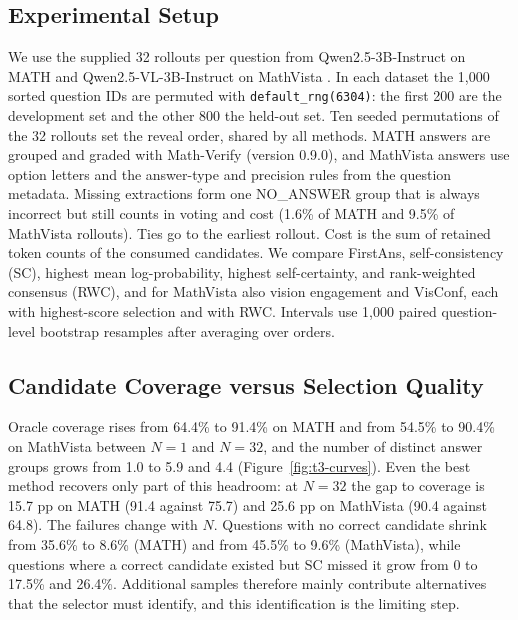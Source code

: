 \documentclass{article}
\begin{document}
\subsection{Experimental Setup}
We use the supplied 32 rollouts per question from Qwen2.5-3B-Instruct \citep{qwen25} on MATH \citep{hendrycks2021math} and Qwen2.5-VL-3B-Instruct \citep{qwen25vl} on MathVista \citep{lu2024mathvista}. In each dataset the 1,000 sorted question IDs are permuted with \texttt{default\_rng(6304)}: the first 200 are the development set and the other 800 the held-out set. Ten seeded permutations of the 32 rollouts set the reveal order, shared by all methods. MATH answers are grouped and graded with Math-Verify \citep{mathverify} (version 0.9.0), and MathVista answers use option letters and the answer-type and precision rules from the question metadata. Missing extractions form one NO\_ANSWER group that is always incorrect but still counts in voting and cost (1.6\% of MATH and 9.5\% of MathVista rollouts). Ties go to the earliest rollout. Cost is the sum of retained token counts of the consumed candidates. We compare FirstAns, self-consistency (SC), highest mean log-probability, highest self-certainty, and rank-weighted consensus (RWC), and for MathVista also vision engagement and VisConf, each with highest-score selection and with RWC. Intervals use 1,000 paired question-level bootstrap resamples after averaging over orders.

\subsection{Candidate Coverage versus Selection Quality}
Oracle coverage rises from 64.4\% to 91.4\% on MATH and from 54.5\% to 90.4\% on MathVista between $N=1$ and $N=32$, and the number of distinct answer groups grows from 1.0 to 5.9 and 4.4 (Figure~\ref{fig:t3-curves}). Even the best method recovers only part of this headroom: at $N=32$ the gap to coverage is 15.7 pp on MATH (91.4 against 75.7) and 25.6 pp on MathVista (90.4 against 64.8). The failures change with $N$. Questions with no correct candidate shrink from 35.6\% to 8.6\% (MATH) and from 45.5\% to 9.6\% (MathVista), while questions where a correct candidate existed but SC missed it grow from 0 to 17.5\% and 26.4\%. Additional samples therefore mainly contribute alternatives that the selector must identify, and this identification is the limiting step.
\end{document}
